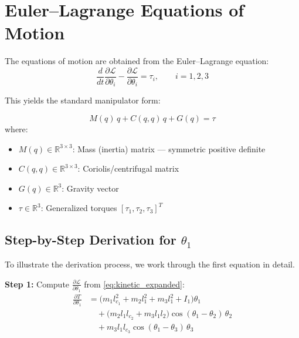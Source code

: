 \documentclass[11pt,a4paper]{article}
\newcommand{\vc}[1]{\bm{#1}}
\newcommand{\mat}[1]{\bm{#1}}
\newcommand{\dt}[1]{\dot{#1}}
\newcommand{\ddt}[1]{\ddot{#1}}
\newcommand{\pder}[2]{\frac{\partial #1}{\partial #2}}
\def\vc#1{#1}%
\def\mat#1{#1}%
\def\dt#1{#1}%
\def\ddt#1{#1}%
\def\bm#1{#1}%
\begin{document}
\section{Euler--Lagrange Equations of Motion}

The equations of motion are obtained from the Euler--Lagrange equation:
\begin{equation}
    \frac{d}{dt}\pder{\mathcal{L}}{\dt{\theta}_i} - \pder{\mathcal{L}}{\theta_i} = \tau_i,
    \qquad i = 1, 2, 3
    \label{eq:euler_lagrange}
\end{equation}

This yields the standard manipulator form:

\begin{resultbox}
\begin{equation}
    \mat{M}(\vc{q}) \, \ddt{\vc{q}} + \vc{C}(\vc{q}, \dt{\vc{q}}) \, \dt{\vc{q}} + \vc{G}(\vc{q}) = \vc{\tau}
    \label{eq:eom}
\end{equation}
where:
\begin{itemize}
    \item $\mat{M}(\vc{q}) \in \mathbb{R}^{3 \times 3}$: Mass (inertia) matrix --- symmetric positive definite
    \item $\vc{C}(\vc{q}, \dt{\vc{q}}) \in \mathbb{R}^{3 \times 3}$: Coriolis/centrifugal matrix
    \item $\vc{G}(\vc{q}) \in \mathbb{R}^{3}$: Gravity vector
    \item $\vc{\tau} \in \mathbb{R}^{3}$: Generalized torques $[\tau_1, \tau_2, \tau_3]^T$
\end{itemize}
\end{resultbox}

\subsection{Step-by-Step Derivation for \texorpdfstring{$\theta_1$}{theta1}}

To illustrate the derivation process, we work through the first equation in detail.

\textbf{Step 1:} Compute $\pder{\mathcal{L}}{\dt{\theta}_1}$ from \cref{eq:kinetic_expanded}:
\begin{align}
    \pder{T}{\dt{\theta}_1} &= \bigl(m_1 l_{c_1}^2 + m_2 l_1^2 + m_3 l_1^2 + I_1\bigr) \dt{\theta}_1 \nonumber \\
    &\quad + \bigl(m_2 l_1 l_{c_2} + m_3 l_1 l_2\bigr) \cos(\theta_1 - \theta_2) \, \dt{\theta}_2 \nonumber \\
    &\quad + m_3 l_1 l_{c_3} \cos(\theta_1 - \theta_3) \, \dt{\theta}_3
    \label{eq:dTddtheta1}
\end{align}
\end{document}
